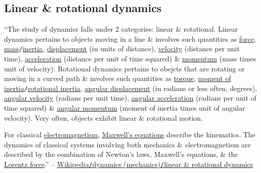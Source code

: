 \documentclass{article}
\begin{document}
\subsection{Linear \& rotational dynamics}
``The study of dynamics falls under 2 categories: linear \& rotational. Linear dynamics pertains to objects moving in a line \& involves such quantities as \href{https://en.wikipedia.org/wiki/Force}{force}, \href{https://en.wikipedia.org/wiki/Mass}{mass}\texttt{/}\href{https://en.wikipedia.org/wiki/Inertia#Mass_and_inertia}{inertia}, \href{https://en.wikipedia.org/wiki/Displacement_(vector)}{displacement} (in units of distance), \href{https://en.wikipedia.org/wiki/Velocity}{velocity} (distance per unit time), \href{https://en.wikipedia.org/wiki/Acceleration}{acceleration} (distance per unit of time squared) \& \href{https://en.wikipedia.org/wiki/Momentum}{momentum} (mass times unit of velocity). Rotational dynamics pertains to obejcts that are rotating or moving in a curved path \& involves such quantities as \href{https://en.wikipedia.org/wiki/Torque}{torque}, \href{https://en.wikipedia.org/wiki/Moment_of_inertia}{moment of inertia}\texttt{/}\href{https://en.wikipedia.org/wiki/Rotational_inertia}{rotational inertia}, \href{https://en.wikipedia.org/wiki/Angular_displacement}{angular displacement} (in radians or less often, degrees), \href{https://en.wikipedia.org/wiki/Angular_velocity}{angular velocity} (radians per unit time), \href{https://en.wikipedia.org/wiki/Angular_acceleration}{angular acceleration} (radians per unit of time squared) \& \href{https://en.wikipedia.org/wiki/Angular_momentum}{angular momentum} (moment of inertia times unit of angular velocity). Very often, objects exhibit linear \& rotational motion.

For classical \href{https://en.wikipedia.org/wiki/Electromagnetism}{electromagnetism}, \href{https://en.wikipedia.org/wiki/Maxwell%27s_equations}{Maxwell's equations} describe the kinematics. The dynamics of classical systems involving both mechanics \& electromagnetism are described by the combination of Newton's laws, Maxwell's equations, \& the \href{https://en.wikipedia.org/wiki/Lorentz_force}{Lorentz force}.'' -- \href{https://en.wikipedia.org/wiki/Dynamics_(mechanics)#Linear_and_rotational_dynamics}{Wikipedia\texttt{/}dynamics (mechanics)\texttt{/}linear \& rotational dynamics}
\end{document}
